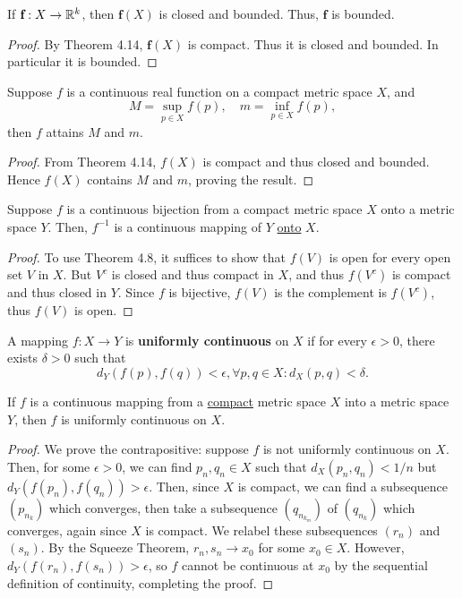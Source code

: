 \begin{theorem} %
    If $\textbf{f} : X \rightarrow \mathbb{R}^k$, then $\textbf{f}(X)$ is closed and bounded. Thus, $\textbf{f}$ is bounded.
\begin{proof}
    By Theorem 4.14, $\textbf{f}(X)$ is compact. Thus it is closed and bounded. In particular it is bounded.
\end{proof}
\end{theorem}

\begin{theorem} %
    Suppose $f$ is a continuous real function on a compact metric space $X$, and
    \[
        M = \sup_{p \in X} f(p),\quad m = \inf_{p \in X} f(p),
    \]
    then $f$ attains $M$ and $m$.

\begin{proof}
    From Theorem 4.14, $f(X)$ is compact and thus closed and bounded. Hence $f(X)$ contains $M$ and $m$, proving the result.
\end{proof}
\end{theorem}

\begin{theorem} %
    Suppose $f$ is a continuous bijection from a compact metric space $X$ onto a metric space $Y$. Then, $f^{-1}$ is a continuous mapping of $Y$ \underline{onto} $X$.
\begin{proof}
    To use Theorem 4.8, it suffices to show that $f(V)$ is open for every open set $V$ in $X$. But $V^c$ is closed and thus compact in $X$, and thus $f(V^c)$ is compact and thus closed in $Y$. Since $f$ is bijective, $f(V)$ is the complement is $f(V^c)$, thus $f(V)$ is open.
\end{proof}
\end{theorem}

\begin{definition} %
    A mapping $f: X \to Y$ is \textbf{uniformly continuous} on $X$ if for every $\epsilon > 0$, there exists $\delta > 0$ such that
    \[
        d_Y(f(p), f(q)) < \epsilon, \forall p, q \in X : d_X(p, q) < \delta.
    \]
\end{definition}

\begin{theorem} %
    If $f$ is a continuous mapping from a \underline{compact} metric space $X$ into a metric space $Y$, then $f$ is uniformly continuous on $X$.
\begin{proof} 
    We prove the contrapositive: suppose $f$ is not uniformly continuous on $X$. Then, for some $\epsilon > 0$, we can find $p_n, q_n \in X$ such that $d_X(p_n, q_n) < 1/n$ but $d_Y(f(p_n), f(q_n)) > \epsilon$. Then, since $X$ is compact, we can find a subsequence $(p_{n_k})$ which converges, then take a subsequence $(q_{n_{k_m}})$ of $(q_{n_k})$ which converges, again since $X$ is compact. We relabel these subsequences $(r_n)$ and $(s_n)$. By the Squeeze Theorem, $r_n, s_n \to x_0$ for some $x_0 \in X$. However, $d_Y(f(r_n), f(s_n)) > \epsilon$, so $f$ cannot be continuous at $x_0$ by the sequential definition of continuity, completing the proof.
\end{proof}
\end{theorem}

